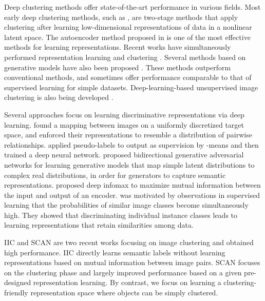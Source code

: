 \documentclass{article} \usepackage{iclr2021_conference,times}
\begin{document}
Deep clustering methods offer state-of-the-art performance in various fields.
Most early deep clustering methods, such as \cite{vincent2010stacked, tian2014learning}, are two-stage methods that apply clustering after learning low-dimensional representations of data in a nonlinear latent space. The autoencoder method proposed in \cite{hinton2006reducing} is one of the most effective methods for learning representations. Recent works have simultaneously performed representation learning and clustering \cite{song2013auto, DEC, yang2017towards, guo2017IDEC, tao2018rdec}. Several methods based on generative models have also been proposed \cite{jiang2016variational, dilokthanakul2016deep}. These methods outperform conventional methods, and sometimes offer performance comparable to that of supervised learning for simple datasets. Deep-learning-based unsupervised image clustering is also being developed \cite{DAC, DCCM, IIC, gupta2020unsupervised, SCAN}. 

Several approaches focus on learning discriminative representations via deep learning.
\cite{bojanowski2017unsupervised} found a mapping between images on a uniformly discretized target space, and enforced their representations to resemble a distribution of pairwise relationships.
\cite{caron2018deep} applied pseudo-labels to output as supervision by -means and then trained a deep neural network.
\cite{donahue2016adversarial} proposed bidirectional generative adversarial networks for learning generative models that map simple latent distributions to complex real distributions, in order for generators to capture semantic representations.
\cite{hjelm2018learning} proposed deep infomax to maximize mutual information between the input and output of an encoder.
\cite{wu2018unsupervised} was motivated by observations in supervised learning that the probabilities of similar image classes become simultaneously high. They showed that discriminating individual instance classes leads to learning representations that retain similarities among data.


IIC \cite{IIC} and SCAN \cite{SCAN} are two recent works focusing on image clustering and obtained high performance. IIC \cite{IIC} directly learns semantic labels without learning representations based on mutual information between image pairs. SCAN \cite{SCAN} focuses on the clustering phase and largely improved performance based on a given pre-designed representation learning. By contrast, we focus on learning a clustering-friendly representation space where objects can be simply clustered.
\end{document}
